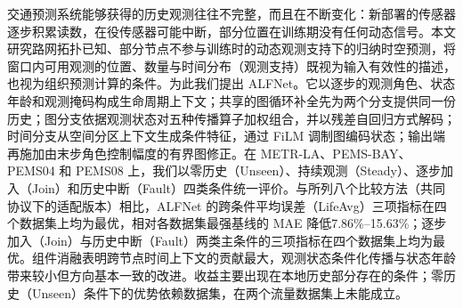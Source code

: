 交通预测系统能够获得的历史观测往往不完整，而且在不断变化：新部署的传感器逐步积累读数，在役传感器可能中断，部分位置在训练期没有任何动态信号。本文研究路网拓扑已知、部分节点不参与训练时的动态观测支持下的归纳时空预测，将窗口内可用观测的位置、数量与时间分布（观测支持）既视为输入有效性的描述，也视为组织预测计算的条件。为此我们提出 ALFNet。它以逐步的观测角色、状态年龄和观测掩码构成生命周期上下文；共享的图循环补全先为两个分支提供同一份历史；图分支依据观测状态对五种传播算子加权组合，并以残差自回归方式解码；时间分支从空间分区上下文生成条件特征，通过 FiLM 调制图编码状态；输出端再施加由末步角色控制幅度的有界图修正。在 METR-LA、PEMS-BAY、PEMS04 和 PEMS08 上，我们以零历史（Unseen）、持续观测（Steady）、逐步加入（Join）和历史中断（Fault）四类条件统一评价。与所列八个比较方法（共同协议下的适配版本）相比，ALFNet 的跨条件平均误差（LifeAvg）三项指标在四个数据集上均为最优，相对各数据集最强基线的 MAE 降低7.86\%–15.63\%；逐步加入（Join）与历史中断（Fault）两类主条件的三项指标在四个数据集上均为最优。组件消融表明跨节点时间上下文的贡献最大，观测状态条件化传播与状态年龄带来较小但方向基本一致的改进。收益主要出现在本地历史部分存在的条件；零历史（Unseen）条件下的优势依赖数据集，在两个流量数据集上未能成立。
